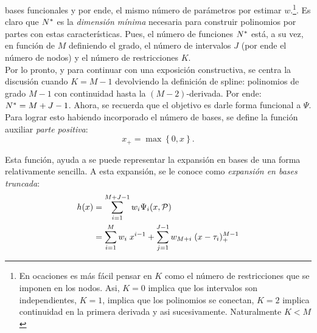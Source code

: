 \documentclass[../Main/Main.tex]{subfiles}
\begin{document}
bases funcionales y por ende, el mismo número de parámetros por estimar $w$.\footnote{En ocaciones es más fácil pensar en $K$ como el número de restricciones que se imponen en los nodos. Asi, $K=0$ implica que los intervalos son independientes, $K = 1$, implica que los polinomios se conectan, $K = 2$ implica continuidad en la primera derivada y asi sucesivamente. Naturalmente $K<M$}. Es claro que $N^*$ es la \textit{dimensión mínima} necesaria para construir polinomios por partes con estas características. Pues, el número de funciones $N^*$ está, a su vez, en función de $M$ definiendo el grado, el número de intervalos $J$ (por ende el número de nodos) y el número de restricciones $K$.\\

Por lo pronto, y para continuar con una exposición constructiva, se centra la discusión cuando $K = M - 1$ devolviendo la definición de spline: polinomios de grado $M-1$ con continuidad hasta la $(M-2)$-derivada. Por ende: $N^* = M + J - 1$. Ahora, se recuerda que el objetivo es darle forma funcional a $\Psi$. Para lograr esto habiendo incorporado el número de bases, se define la función auxiliar \textit{parte positiva}:
$$  x_+ = \max\left\{0,x\right\}.$$

Esta función, ayuda a se puede representar la expansión en bases de una forma relativamente sencilla. A esta expansión, se le conoce como \textit{expansión en bases truncada}:
\begin{align}
	h(x) &= \sum_{i = 1}^{M + J - 1} w_i \Psi_i(x,\mathcal{P}) \nonumber \\ 
 		 &=	\sum_{i = 1}^M w_i \; x^{i-1} + \sum_{j = 1}^{J-1}w_{M+i}\;(x - \tau_i)_+^{M-1}	\label{ec:SplineGeneral}
\end{align}
\end{document}
